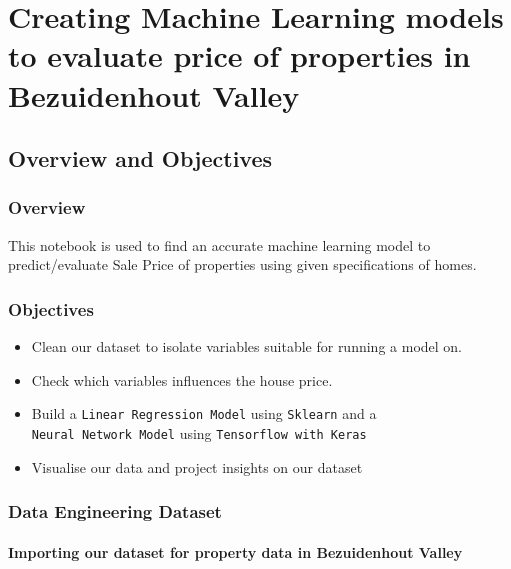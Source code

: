 
\hypertarget{creating-machine-learning-models-to-evaluate-price-of-properties-in-bezuidenhout-valley}{%
\section{Creating Machine Learning models to evaluate price of
properties in Bezuidenhout
Valley}\label{creating-machine-learning-models-to-evaluate-price-of-properties-in-bezuidenhout-valley}}

    \hypertarget{overview-and-objectives}{%
\subsection{Overview and Objectives}\label{overview-and-objectives}}

\hypertarget{overview}{%
\subsubsection{Overview}\label{overview}}

This notebook is used to find an accurate machine learning model to
predict/evaluate Sale Price of properties using given specifications of
homes.

\hypertarget{objectives}{%
\subsubsection{Objectives}\label{objectives}}

\begin{itemize}
\tightlist
\item
  Clean our dataset to isolate variables suitable for running a model
  on.
\item
  Check which variables influences the house price.
\item
  Build a \texttt{Linear\ Regression\ Model} using \texttt{Sklearn} and
  a \texttt{Neural\ Network\ Model} using
  \texttt{Tensorflow\ with\ Keras}
\item
  Visualise our data and project insights on our dataset
\end{itemize}

    \hypertarget{data-engineering-dataset}{%
\subsubsection{Data Engineering
Dataset}\label{data-engineering-dataset}}

    \hypertarget{importing-our-dataset-for-property-data-in-bezuidenhout-valley}{%
\paragraph{Importing our dataset for property data in Bezuidenhout
Valley}\label{importing-our-dataset-for-property-data-in-bezuidenhout-valley}}

